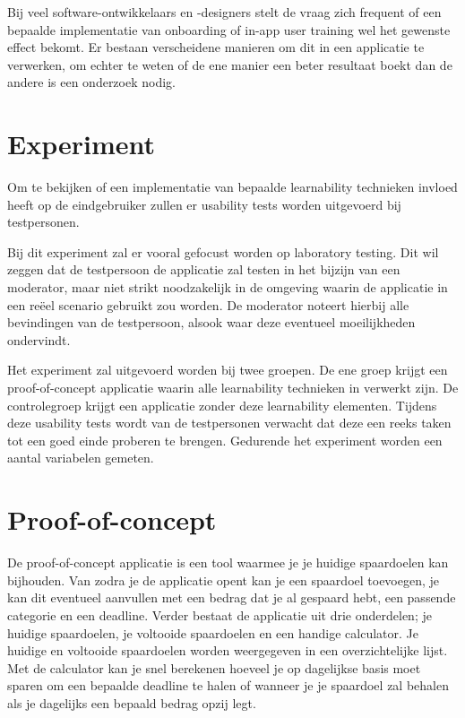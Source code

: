 \documentclass[a0,portrait]{a0poster}
\begin{document}
\begin{multicols}{2}
Bij veel software-ontwikkelaars en -designers stelt de vraag zich frequent of een bepaalde implementatie van onboarding of in-app user training wel het gewenste effect bekomt. Er bestaan verscheidene manieren om dit in een applicatie te verwerken, om echter te weten of de ene manier een beter resultaat boekt dan de andere is een onderzoek nodig.

\color{Black} %
\color{HoGentAccent1} 
\section*{Experiment}
\color{black}

Om te bekijken of een implementatie van bepaalde learnability technieken invloed heeft op de eindgebruiker zullen er usability tests worden uitgevoerd bij testpersonen.

Bij dit experiment zal er vooral gefocust worden op laboratory testing. Dit wil zeggen dat de testpersoon de applicatie zal testen in het bijzijn van een moderator, maar niet strikt noodzakelijk in de omgeving waarin de applicatie in een reëel scenario gebruikt zou worden. De moderator noteert hierbij alle bevindingen van de testpersoon, alsook waar deze eventueel moeilijkheden ondervindt.

Het experiment zal uitgevoerd worden bij twee groepen. De ene groep krijgt een proof-of-concept applicatie waarin alle learnability technieken in verwerkt zijn. De controlegroep krijgt een applicatie zonder deze learnability elementen. Tijdens deze usability tests wordt van de testpersonen verwacht dat deze een reeks taken tot een goed einde proberen te brengen. Gedurende het experiment worden een aantal variabelen gemeten.

\color{HoGentAccent1} 
\section*{Proof-of-concept}
\color{black}

De proof-of-concept applicatie is een tool waarmee je je huidige spaardoelen kan bijhouden. Van zodra je de applicatie opent kan je een spaardoel toevoegen, je kan dit eventueel aanvullen met een bedrag dat je al gespaard hebt, een passende categorie en een deadline. Verder bestaat de applicatie uit drie onderdelen; je huidige spaardoelen, je voltooide spaardoelen en een handige calculator. Je huidige en voltooide spaardoelen worden weergegeven in een overzichtelijke lijst. Met de calculator kan je snel berekenen hoeveel je op dagelijkse basis moet sparen om een bepaalde deadline te halen of wanneer je je spaardoel zal behalen als je dagelijks een bepaald bedrag opzij legt.


\end{multicols}
\end{document}
